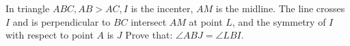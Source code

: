 In triangle $ABC,AB>AC,I$ is the incenter, $AM$ is the midline. The line crosses $I$ and is perpendicular to $BC $ intersect $AM$ at point $L$, and the symmetry of $I$ with respect to point $A$ is $J$
Prove that: $\angle ABJ= \angle LBI$.